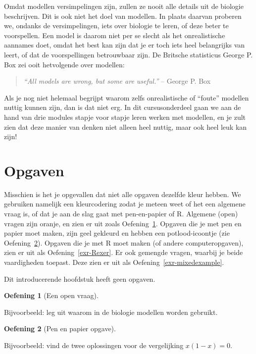 \documentclass[
  a4paper,
]{scrbook}
\theoremstyle{definition}
\newtheorem{exercise}{Oefening}[chapter]
\theoremstyle{remark}
\begin{document}
Omdat modellen versimpelingen zijn, zullen ze nooit alle details uit de
biologie beschrijven. Dit is ook niet het doel van modellen. In plaats
daarvan proberen we, ondanks de versimpelingen, iets over biologie te
leren, of deze beter te voorspellen. Een model is daarom niet per se
slecht als het onrealistische aannames doet, omdat het best kan zijn dat
je er toch iets heel belangrijks van leert, of dat de voorspellingen
betrouwbaar zijn. De Britsche statisticus George P. Box zei ooit
hetvolgende over modellen:

\begin{quote}
\emph{``All models are wrong, but some are useful.''} -- George P. Box
\end{quote}

Als je nog niet helemaal begrijpt waarom zelfs onrealistische of
``foute'' modellen nuttig kunnen zijn, dan is dat niet erg. In dit
cursusonderdeel gaan we aan de hand van drie modules stapje voor stapje
leren werken met modellen, en je zult zien dat deze manier van denken
niet alleen heel nuttig, maar ook heel leuk kan zijn!

\section{Opgaven}\label{opgaven-2}

Misschien is het je opgevallen dat niet alle opgaven dezelfde kleur
hebben. We gebruiken namelijk een kleurcodering zodat je meteen weet of
het een algemene vraag is, of dat je aan de slag gaat met pen-en-papier
of R. Algemene (open) vragen zijn oranje, en zien er uit zoals
Oefening~\ref{exr-overigevraag}. Opgaven die je met pen en papier moet
maken, zijn geel gekleurd en hebben een potlood-icoontje (zie
Oefening~\ref{exr-pep1}). Opgaven die je met R moet maken (of andere
computeropgaven), zien er uit als Oefening~\ref{exr-Rexer}. Er ook
gemengde vragen, waarbij je beide vaardigheden toepast. Deze zien er uit
als Oefening~\ref{exr-mixedexample}.

Dit introducerende hoofdstuk heeft geen opgaven.

\begin{exercise}[Een open
vraag]\protect\hypertarget{exr-overigevraag}{}\label{exr-overigevraag}

Bijvoorbeeld: leg uit waarom in de biologie modellen worden gebruikt.

\end{exercise}

\begin{exercise}[Pen en papier
opgave]\protect\hypertarget{exr-pep1}{}\label{exr-pep1}

Bijvoorbeeld: vind de twee oplossingen voor de vergelijking
\(x(1-x)=0\).

\end{exercise}
\end{document}
